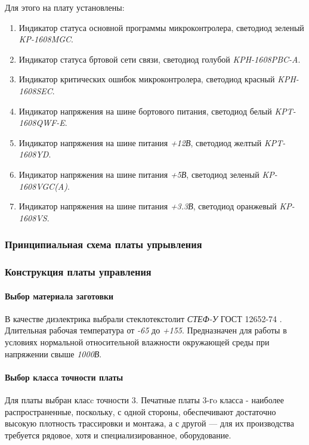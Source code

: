 Для этого на плату установлены:
\begin{enumerate}
    \item Индикатор статуса основной программы микроконтролера,
            светодиод зеленый \textit{KP-1608MGC}.
    \item Индикатор статуса бртовой сети связи,
            светодиод голубой \textit{KPH-1608PBC-A}.
    \item Индикатор критических ошибок микроконтролера,
            светодиод красный \textit{KPH-1608SEC}.
    \item Индикатор напряжения на шине бортового питания,
            светодиод белый \textit{KPT-1608QWF-E}.
    \item Индикатор напряжения на шине питания \textit{+12В},
            светодиод желтый \textit{KPT-1608YD}.
    \item Индикатор напряжения на шине питания \textit{+5В},
            светодиод зеленый \textit{KP-1608VGC(A)}.
    \item Индикатор напряжения на шине питания \textit{+3.3В},
            светодиод оранжевый \textit{KP-1608VS}.
\end{enumerate}

\subsubsection{Принципиальная схема платы упрывления}
\subsubsection{Конструкция платы управления}
\paragraph{Выбор материала заготовки}
В качестве диэлектрика выбрали стеклотекстолит
\textit{СТЕФ-У} ГОСТ 12652-74 \cite{GOST_12652_74}.
Длительная рабочая температура от \textit{-65\textcelsius}
до \textit{+155\textcelsius}.
Предназначен для работы в условиях нормальной относительной влажности
окружающей среды при напряжении свыше \textit{1000В}.

\paragraph{Выбор класса точности платы}
Для платы выбран класc точности 3.
Печатные платы 3-гo класса - наиболее распространенные, поскольку, с одной
стороны, обеспечивают достаточно высокую плотность трассировки и монтажа, а с
другой — для их производства требуется рядовое, хотя и специализированное,
оборудование.

